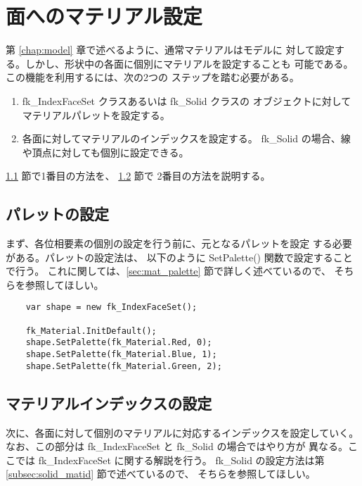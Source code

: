\section{面へのマテリアル設定} \label{sec:ifs_mat}
第 \ref{chap:model} 章で述べるように、通常マテリアルはモデルに
対して設定する。しかし、形状中の各面に個別にマテリアルを設定することも
可能である。この機能を利用するには、次の2つの
ステップを踏む必要がある。
\begin{enumerate}
 \item fk\_IndexFaceSet クラスあるいは fk\_Solid クラスの
	オブジェクトに対してマテリアルパレットを設定する。
 \item 各面に対してマテリアルのインデックスを設定する。
	fk\_Solid の場合、線や頂点に対しても個別に設定できる。
\end{enumerate}
\ref{subsec:ifs_palette} 節で1番目の方法を、
\ref{subsec:ifs_matid} 節で
2番目の方法を説明する。
\subsection{パレットの設定} \label{subsec:ifs_palette}
まず、各位相要素の個別の設定を行う前に、元となるパレットを設定
する必要がある。パレットの設定法は、
以下のように SetPalette() 関数で設定することで行う。
これに関しては、\ref{sec:mat_palette} 節で詳しく述べているので、
そちらを参照してほしい。
\\
\begin{breakbox}
\begin{verbatim}
    var shape = new fk_IndexFaceSet();

    fk_Material.InitDefault();
    shape.SetPalette(fk_Material.Red, 0);
    shape.SetPalette(fk_Material.Blue, 1);
    shape.SetPalette(fk_Material.Green, 2);
\end{verbatim}
\end{breakbox}
\subsection{マテリアルインデックスの設定} \label{subsec:ifs_matid}
次に、各面に対して個別のマテリアルに対応するインデックスを設定していく。
なお、この部分は fk\_IndexFaceSet と fk\_Solid の場合ではやり方が
異なる。ここでは fk\_IndexFaceSet に関する解説を行う。
fk\_Solid の設定方法は第 \ref{subsec:solid_matid} 節で述べているので、
そちらを参照してほしい。


